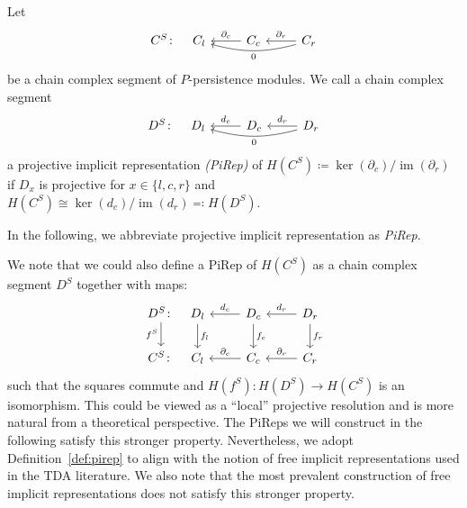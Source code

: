 \documentclass[english,a4paper,nolineno,cleveref]{socg-lipics-v2021}
\DeclareMathOperator{\im}{im}
\begin{document}
\begin{definition} \label{def:pirep}
Let 
\begin{equation*}
\begin{tikzcd}
C^S\colon &[-20pt] C_{l} & C_c \arrow[l,swap,"\partial_{c}"] & C_{r} \arrow[l,swap,"\partial_r"] \arrow[ll,bend left=15pt, "0"]
\end{tikzcd}
\end{equation*}
be a chain complex segment of $P$-persistence modules. We call a chain complex segment
\begin{equation*}
\begin{tikzcd}
D^S\colon &[-20pt] D_{l} & D_c \arrow[l,swap,"d_{c}"] & D_{r} \arrow[l,swap,"d_{r}"] \arrow[ll,bend left=15pt, "0"]
\end{tikzcd}
\end{equation*}
a projective implicit representation \emph{(PiRep)} of $H(C^S)\coloneqq \ker(\partial_c)/\im(\partial_{r})$ if $D_x$ is projective for $x\in\{l,c,r\}$ and $H(C^S)\cong \ker(d_c)/\im(d_{r})\eqqcolon H(D^S)$.
\end{definition}

In the following, we abbreviate projective implicit representation as \emph{PiRep}.

\begin{remark}
We note that we could also define a PiRep of $H(C^S)$ as a chain complex segment $D^S$ together with maps: 
\begin{equation*}
\begin{tikzcd}
D^S\colon \arrow[d,swap,"f^S"] &[-20pt] D_{l} \arrow[d,"f_{l}"] & D_c \arrow[l,swap,"d_{c}"] \arrow[d,"f_{c}"] & D_{r} \arrow[l,swap,"d_{r}"] \arrow[d,"f_{r}"] \\ 
C^S\colon &[-20pt] C_{l} & C_c \arrow[l,swap,"\partial_{c}"] & C_{r} \arrow[l,swap,"\partial_{r}"]
\end{tikzcd}
\end{equation*}
such that the squares commute and $H(f^S)\colon H(D^S)\rightarrow H(C^S)$ is an isomorphism. This could be viewed as a ``local'' projective resolution and is more natural from a theoretical perspective. The PiReps we will construct in the following satisfy this stronger property. Nevertheless, we adopt Definition~\ref{def:pirep} to align with the notion of free implicit representations used in the TDA literature. We also note that the most prevalent construction of free implicit representations \cite{chacholski2017combinatorial} does not satisfy this stronger property.
\end{remark}
\end{document}
